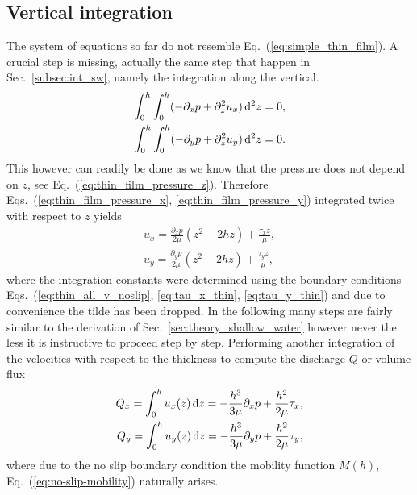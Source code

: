 \subsection{Vertical integration}
\label{subsec:thin_film_int}
The system of equations so far do not resemble Eq.~(\ref{eq:simple_thin_film}).
A crucial step is missing, actually the same step that happen in Sec.~\ref{subsec:int_sw}, namely the integration along the vertical.
\begin{align}\label{eq:int_vels_thin}
    \int_0^h\int_0^h (-\partial_x p + \partial_z^2 u_x ) \mathop{}\!\mathrm{d}^2 z = 0,  \\
    \int_0^h\int_0^h (-\partial_y p + \partial_z^2 u_y ) \mathop{}\!\mathrm{d}^2 z = 0. 
\end{align}
This however can readily be done as we know that the pressure does not depend on $z$, see Eq.~(\ref{eq:thin_film_pressure_z}). 
Therefore Eqs.~(\ref{eq:thin_film_pressure_x}, \ref{eq:thin_film_pressure_y}) integrated twice with respect to $z$ yields
\begin{align}
    u_x = \frac{\partial_x p}{2\mu}(z^2 - 2hz) + \frac{\tau_x z}{\mu}, \label{eq:vel_x_int_thin}\\
    u_y = \frac{\partial_y p}{2\mu}(z^2 - 2hz) + \frac{\tau_y z}{\mu}, \label{eq:vel_y_int_thin}
\end{align}
where the integration constants were determined using the boundary conditions Eqs.~(\ref{eq:thin_all_v_noslip}, \ref{eq:tau_x_thin}, \ref{eq:tau_y_thin}) and due to convenience the tilde has been dropped.
In the following many steps are fairly similar to the derivation of Sec.~\ref{sec:theory_shallow_water} however never the less it is instructive to proceed step by step.
Performing another integration of the velocities with respect to the thickness to compute the discharge $Q$ or volume flux 
\begin{align}
    Q_x = \int_0^h u_x(z)\mathop{}\!\mathrm{d} z = -\frac{h^3}{3\mu}\partial_x p + \frac{h^2}{2\mu} \tau_x, \label{eq:discharge_thin_x} \\
    Q_y = \int_0^h u_y(z)\mathop{}\!\mathrm{d} z = -\frac{h^3}{3\mu}\partial_y p + \frac{h^2}{2\mu} \tau_y, \label{eq:discharge_thin_y}
\end{align}
where due to the no slip boundary condition the mobility function $M(h)$, Eq.~(\ref{eq:no-slip-mobility}) naturally arises.

